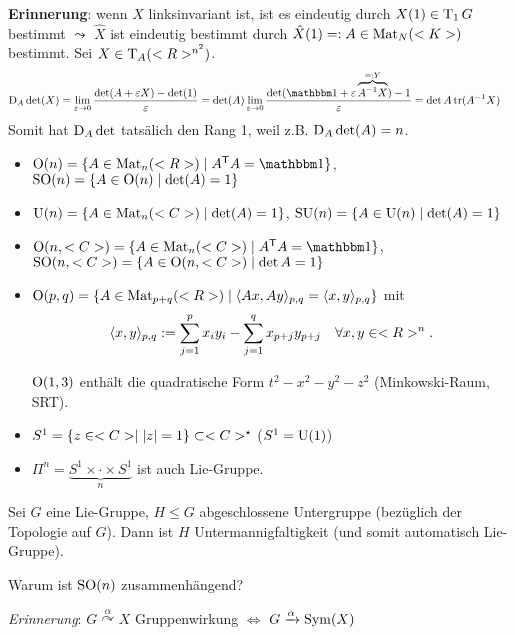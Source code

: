 \textbf{Erinnerung}: wenn $X$ linksinvariant ist, ist es eindeutig durch $X(1)\in \operatorname{T}_1 G$ bestimmt $\leadsto$ $\hat X$ ist eindeutig bestimmt durch $\hat X(1) =: A\in\operatorname{Mat}_N(<K>)$ bestimmt. Sei $X\in \operatorname{T}_A(<R>^{n^2})$. \begin{align*}
	\D_A \det(X) &= \lim\limits_{\epsilon\to 0} \frac{\det(A+\epsilon X) - \det(1)}{\epsilon} = \det(A)\lim\limits_{\epsilon\to 0} \frac{\det(\mathbbm 1 + \epsilon \overbrace{A^{-1} X}^{=:Y})-1}{\epsilon} = \det A\tr(A^{-1} X)
\end{align*}
Somit hat $\operatorname{D}_A \det$ tatsälich den Rang 1, weil z.B. $\operatorname{D}_A \det(A) = n$. \begin{itemize}
	\item $\Orth(n) = \{A\in\Mat_n(\R)\mid \transpose{A}A = \mathbbm 1\}$, $\operatorname{SO}(n) = \{A\in\operatorname{O}(n)\mid \det(A) = 1\}$
	\item $\operatorname{U}(n) = \{A\in \operatorname{Mat}_n(<C>)\mid \det(A) = 1\}$, $\operatorname{SU}(n) = \{A\in \operatorname{U}(n)\mid \det(A) = 1\}$
	\item $\Orth(n,\C) = \{A\in\Mat_n(\C)\mid \transpose{A}A = \mathbbm 1\}$, $\operatorname{SO}(n,<C>) = \{A\in\operatorname{O}(n,<C>)\mid \det A=1\}$
	\item $\operatorname{O}(p,q) = \{A\in\operatorname{Mat}_{p+q}(<R>)\mid \langle Ax,Ay\rangle_{p,q} = \langle x,y\rangle_{p,q}\}$ mit \begin{align*}
		\langle x,y\rangle_{p,q} := \sum_{j=1}^p x_i y_i - \sum_{j=1}^q x_{p+j} y_{p+j}\quad\forall x,y\in<R>^n.
	\end{align*}

\begin{example}
	$\operatorname{O}(1,3)$ enthält die quadratische Form $t^2-x^2-y^2-z^2$ (Minkowski-Raum, SRT).
\end{example}
	\item $S^1 = \{z\in<C>\mid \vert z\vert = 1\}\subset <C>^\star$ ($S^1 = \operatorname{U}(1)$)
	\item $\Pi^n = \underbrace{S^1\times \cdot \times S^1}_{n}$ ist auch Lie-Gruppe.
\end{itemize}

\begin{proposition}[Cartan]
	Sei $G$ eine Lie-Gruppe, $H\le G$ abgeschlossene Untergruppe (bezüglich der Topologie auf $G$). Dann ist $H$ Untermannigfaltigkeit (und somit automatisch Lie-Gruppe).
\end{proposition}

Warum ist $\operatorname{SO}(n)$ zusammenhängend?

\emph{Erinnerung}: $G\overset{\alpha}{\curvearrowright} X$ Gruppenwirkung $\Leftrightarrow$ $G\xrightarrow\alpha \operatorname{Sym}(X)$

